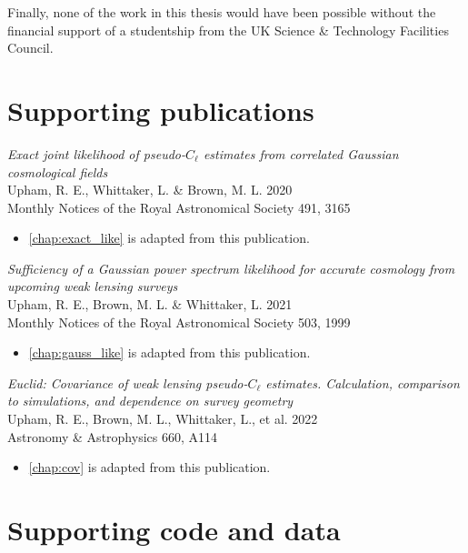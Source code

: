 Finally, none of the work in this thesis would have been possible without the financial support of a studentship from the UK Science \& Technology Facilities Council.


\chapter*{Supporting publications}

\textit{Exact joint likelihood of pseudo-$C_\ell$ estimates from correlated Gaussian cosmological fields} \\
Upham, R. E., Whittaker, L. \& Brown, M. L. 2020 \\
Monthly Notices of the Royal Astronomical Society 491, 3165

\begin{itemize}
  \item \autoref{chap:exact_like}
is adapted from this publication.
\end{itemize}

\textit{Sufficiency of a Gaussian power spectrum likelihood for accurate cosmology from upcoming weak lensing surveys} \\
Upham, R. E., Brown, M. L. \& Whittaker, L. 2021 \\
Monthly Notices of the Royal Astronomical Society 503, 1999

\begin{itemize}
  \item \autoref{chap:gauss_like}
is adapted from this publication.
\end{itemize}

\textit{Euclid: Covariance of weak lensing pseudo-$C_\ell$ estimates. Calculation, comparison to simulations, and dependence on survey geometry} \\
Upham, R. E., Brown, M. L., Whittaker, L., et al. 2022 \\
Astronomy \& Astrophysics 660, A114

\begin{itemize}
  \item \autoref{chap:cov}
is adapted from this publication.
\end{itemize}


\chapter*{Supporting code and data}

